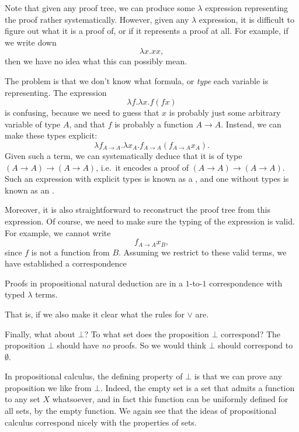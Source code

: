 \documentclass[a4paper]{article}
\begin{document}
Note that given any proof tree, we can produce some $\lambda$ expression representing the proof rather systematically. However, given any $\lambda$ expression, it is difficult to figure out what it is a proof of, or if it represents a proof at all. For example, if we write down
\[
  \lambda x. xx,
\]
then we have no idea what this can possibly mean.

The problem is that we don't know what formula, or \emph{type} each variable is representing. The expression
\[
  \lambda f. \lambda x. f (f x)
\]
is confusing, because we need to guess that $x$ is probably just some arbitrary variable of type $A$, and that $f$ is probably a function $A \to A$. Instead, we can make these types explicit:
\[
  \lambda f_{A \to A}. \lambda x_A. f_{A \to A} (f_{A \to A} x_A).
\]
Given such a term, we can systematically deduce that it is of type $(A \to A) \to (A \to A)$, i.e.\ it encodes a proof of $(A \to A) \to (A \to A)$. Such an expression with explicit types is known as a , and one without types is known as an .

Moreover, it is also straightforward to reconstruct the proof tree from this expression. Of course, we need to make sure the typing of the expression is valid. For example, we cannot write
\[
  f_{A \to A} x_B,
\]
since $f$ is not a function from $B$. Assuming we restrict to these valid terms, we have established a correspondence
\begin{significant}
  Proofs in propositional natural deduction are in a $1$-to-$1$ correspondence with typed $\lambda$ terms.
\end{significant}
That is, if we also make it clear what the rules for $\vee$ are.

Finally, what about $\bot$? To what set does the proposition $\bot$ correspond? The proposition $\bot$ should have \emph{no} proofs. So we would think $\bot$ should correspond to $\emptyset$.

In propositional calculus, the defining property of $\bot$ is that we can prove any proposition we like from $\bot$. Indeed, the empty set is a set that admits a function to any set $X$ whatsoever, and in fact this function can be uniformly defined for all sets, by the empty function. We again see that the ideas of propositional calculus correspond nicely with the properties of sets.
\end{document}

